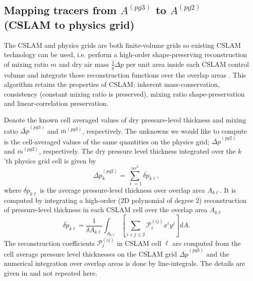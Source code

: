 \subsection{Mapping tracers from $A^{(pg3)}$ to $A^{(pg2)}$ (CSLAM to physics grid)}\label{sec:nctopg}
The CSLAM and physics grids are both finite-volume grids so existing CSLAM technology can be used, i.e. perform a high-order shape-preserving reconstruction of mixing ratio $m$ and dry air mass  $\frac{1}{g}\Delta p$ per unit area inside each CSLAM control volume and integrate those reconstruction functions over the overlap areas \citep{LNU2010JCP,NL2010JCP}. This algorithm retains the properties of CSLAM: inherent mass-conservation, consistency (constant mixing ratio is preserved), mixing ratio shape-preservation and linear-correlation preservation. 

Denote the known cell averaged values of dry pressure-level thickness and mixing ratio $\overline{\Delta p}^{(pg3)}$ and $\overline{m}^{(pg3)}$, respectively. The unknowns we would like to compute is the cell-averaged values of the same quantities on the physics grid; $\overline{\Delta p}^{(pg2)}$ and $\overline{m}^{(pg2)}$, respectively. The dry pressure level thickness integrated over the $k$'th physics grid cell is given by
\begin{equation}
\label{eq:p}
\overline{\Delta p}^{(pg2)}_k=\sum_{\ell=1}^{nc^2}\overline{\delta p}_{k\ell},
\end{equation}
where $\overline{\delta p}_{k\ell}$ is the average pressure-level thickness over overlap area $A_{k\ell}$. It is computed by integrating a high-order (2D polynomial of degree 2) reconstruction of pressure-level thickness in each CSLAM cell over the overlap area $A_{k\ell}$
\begin{equation}
\label{eq:pg3dp}
\overline{\delta p}_{k\ell}=\frac{1}{\delta A_{k\ell}}\int_{A_{k\ell}}\left[ \sum_{i+j\le 2}{\mathcal{P}}^{(ij)}_\ell x^{i}y^{j}\right] dA.
\end{equation}
The reconstruction coefficients ${\mathcal{P}}^{(ij)}_\ell$ in CSLAM cell $\ell$ are computed from the cell average pressure level thicknesses on the CSLAM grid $\overline{\Delta p}^{(pg3)}$ and the numerical integration over overlap areas is done by line-integrals. The details are given in \cite{LNU2010JCP} and not repeated here.


